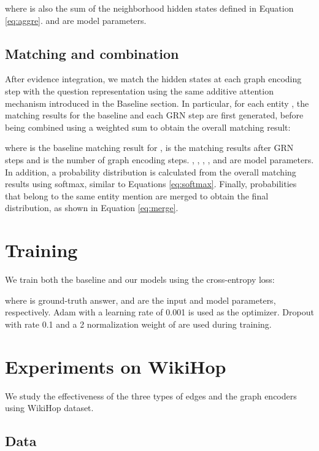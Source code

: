 \documentclass[letterpaper]{article}
\begin{document}
where  is also the sum of the neighborhood hidden states defined in Equation \ref{eq:aggre}. 
 and  are model parameters.





\subsection{Matching and combination}

After evidence integration, we match the hidden states at each graph encoding step with the question representation using the same additive attention mechanism introduced in the Baseline section.
In particular, for each entity , the matching results for the baseline and each GRN step  are first generated, before being combined using a weighted sum to obtain the overall matching result:

where  is the baseline matching result for ,  is the matching results after  GRN steps and  is the number of graph encoding steps. 
, , , ,  and  are model parameters.
In addition, a probability distribution is calculated from the overall matching results using softmax, similar to Equations \ref{eq:softmax}. 
Finally, probabilities that belong to the same entity mention are merged to obtain the final distribution, as shown in Equation \ref{eq:merge}.


\section{Training} 
We train both the baseline and our models using the cross-entropy loss:

where  is ground-truth answer,  and  are the input and model parameters, respectively.
Adam \citep{kingma2014adam} with a learning rate of 0.001 is used as the optimizer. 
Dropout with rate 0.1 and a 2 normalization weight of  are used during training.

\section{Experiments on WikiHop}

We study the effectiveness of the three types of edges and the graph encoders using WikiHop \citep{welbl2018constructing} dataset.


\subsection{Data}
\end{document}
